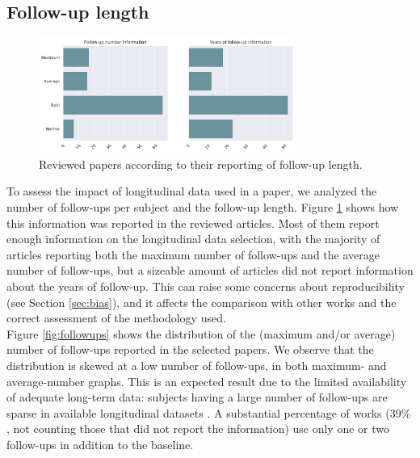 \subsection{Follow-up length} 
 
 \begin{figure}[!htbp]
\centering
\includegraphics[width=0.75\textwidth]{figures/review/Fig2.pdf}
    \caption{Reviewed papers according to their reporting of follow-up length.}\label{fig:followupsdist}
\end{figure}
 
To assess the impact of longitudinal data used in a paper, we analyzed the number of follow-ups per subject and the follow-up length. Figure \ref{fig:followupsdist} shows how this information was reported in the reviewed articles. Most of them report enough information on the longitudinal data selection, with the majority of articles reporting both the maximum number of follow-ups and the average number of follow-ups, but a sizeable amount of articles did not report information about the years of follow-up. This can raise some concerns about reproducibility (see Section \ref{sec:bias}), and it affects the comparison with other works and the correct assessment of the methodology used. \\

Figure \ref{fig:followups} shows the distribution of the (maximum and/or average) number of follow-ups reported in the selected papers. We observe that the distribution is skewed at a low number of follow-ups, in both maximum- and average-number graphs. This is an expected result due to the limited availability of adequate long-term data: subjects having a large number of follow-ups are sparse in available longitudinal datasets \cite{Lawrence2017}. A substantial percentage of works ($39\%$, not counting those that did not report the information) use only one or two follow-ups in addition to the baseline. \\


